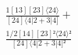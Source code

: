 \documentclass[varwidth, border=5pt]{standalone}
\begin{document}
\begin{my}
$\begin{gathered}
\scriptscriptstyle\frac{1[13][23]⟨24⟩}{[24]⟨4|2+3|4]} +\\
\scriptscriptstyle\frac{1/2[14][23]²⟨24⟩²}{[24]⟨4|2+3|4]²} \phantom{+}
\end{gathered}$
\end{my}
\end{document}
